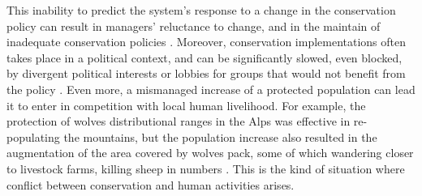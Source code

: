 \documentclass[12pt,a4paper]{article}
\begin{document}
This inability to predict the system's response to a change in the conservation policy can result in managers' reluctance to change, and in the maintain of inadequate conservation policies \citep{peterson2005conservation, keith2011uncertainty}.
Moreover, conservation implementations often takes place in a political context, and can be significantly slowed, even blocked, by divergent political interests or lobbies for groups that would not benefit from the policy \citep{keith2011uncertainty}.
Even more, a mismanaged increase of a protected population can lead it to enter in competition with local human livelihood.
For example, the protection of wolves distributional ranges in the Alps was effective in re-populating the mountains, but the population increase also resulted in the augmentation of the area covered by wolves pack, some of which wandering closer to livestock farms, killing sheep in numbers \citep{behr2017combining}.
This is the kind of situation where conflict between conservation and human activities arises. %

\end{document}
